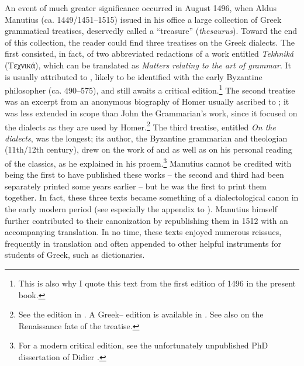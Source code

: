 An event of much greater significance occurred in August 1496, when Aldus Manutius (ca. 1449/1451–1515) issued in his  office a large collection of Greek grammatical treatises, deservedly called a “treasure” (\textit{thesaurus}). Toward the end of this collection, the reader could find three treatises on the Greek dialects. The first consisted, in fact, of two abbreviated redactions of a work entitled \textit{Tekhniká} (Tεχνικά), which can be translated as \textit{Matters relating to the art of grammar}. It is usually attributed to , likely to be identified with the early Byzantine philosopher  (ca. 490–575), and still awaits a critical edition.\footnote{This is also why I quote this text from the first edition of 1496 in the present book.} The second treatise was an excerpt from an anonymous biography of Homer usually ascribed to ; it was less extended in scope than John the Grammarian’s work, since it focused on the dialects as they are used by Homer.\footnote{See the edition in \citet{Kindstrand1990}. A Greek– edition is available in \citet{Keaney1996}. See also \citet{VanRooy2018c} on the Renaissance fate of the treatise.} The third treatise, entitled \textit{On the dialects}, was the longest; its author, the Byzantine grammarian and theologian  (11th/12th century), drew on the work of  and  as well as on his personal reading of the classics, as he explained in his proem.\footnote{For a modern critical edition, see the unfortunately unpublished PhD dissertation of Didier \citet{Xhardez1991}.} Manutius cannot be credited with being the first to have published these works – the second and third had been separately printed some years earlier – but he was the first to print them together. In fact, these three texts became something of a dialectological canon in the early modern period (see especially the appendix to \citealt{Trovato1984}). Manutius himself further contributed to their canonization by republishing them in 1512 with an accompanying  translation. In no time, these texts enjoyed numerous reissues, frequently in  translation and often appended to other helpful instruments for students of Greek, such as dictionaries.


